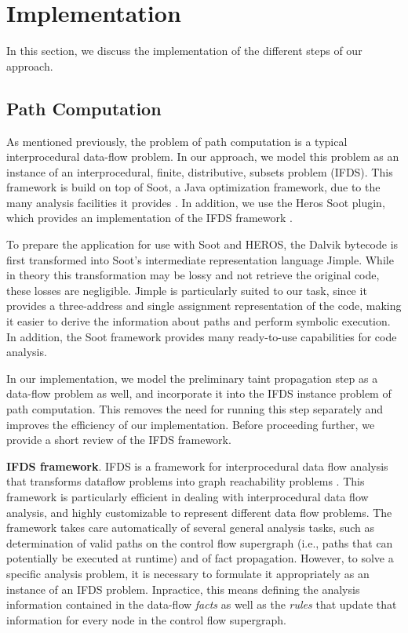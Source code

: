 \section{Implementation}
\label{sec:implementation}

In this section, we discuss the implementation of the different steps of our approach.

\subsection{Path Computation}
As mentioned previously, the problem of path computation is a typical interprocedural data-flow problem. In our approach, we model this problem as an instance of an interprocedural, finite, distributive, subsets problem (IFDS). This framework is build on top of Soot, a Java optimization framework, due to the many analysis facilities it provides \cite{heros,Bodden:2012:IDA:2259051.2259052,Vallee-Rai:1999:SJB:781995.782008}. In addition, we use the Heros Soot plugin, which provides an implementation of the IFDS framework \cite{heros}.

To prepare the application for use with Soot and HEROS, the Dalvik bytecode is first transformed into Soot's intermediate representation language Jimple. While in theory this transformation may be lossy and not retrieve the original code, these losses are negligible. Jimple is particularly suited to our task, since it provides a three-address and single assignment representation of the code, making it easier to derive the information about paths and perform symbolic execution. In addition, the Soot framework provides many ready-to-use capabilities for code analysis.

In our implementation, we model the preliminary taint propagation step as a data-flow problem as well, and incorporate it into the IFDS instance problem of path computation. This removes the need for running this step separately and improves the efficiency of our implementation. Before proceeding further, we provide a short review of the IFDS framework.

\noindent
\textbf{IFDS framework}.
IFDS is a framework for interprocedural data flow analysis that transforms dataflow problems into graph reachability problems \cite{ifds,Bodden:2012:IDA:2259051.2259052}. This framework  is particularly efficient in dealing with interprocedural data flow analysis, and highly customizable to represent different data flow problems. The framework takes care automatically of several general analysis tasks, such as
determination of valid paths on the control flow supergraph (i.e., paths that can potentially be executed at runtime) and of fact propagation. However, to solve a specific analysis problem, it is necessary to formulate it appropriately as an instance of an IFDS problem. Inpractice, this means defining the analysis information contained in the data-flow \emph{facts} as well as the \emph{rules} that update that information for every node in the control flow supergraph. 

